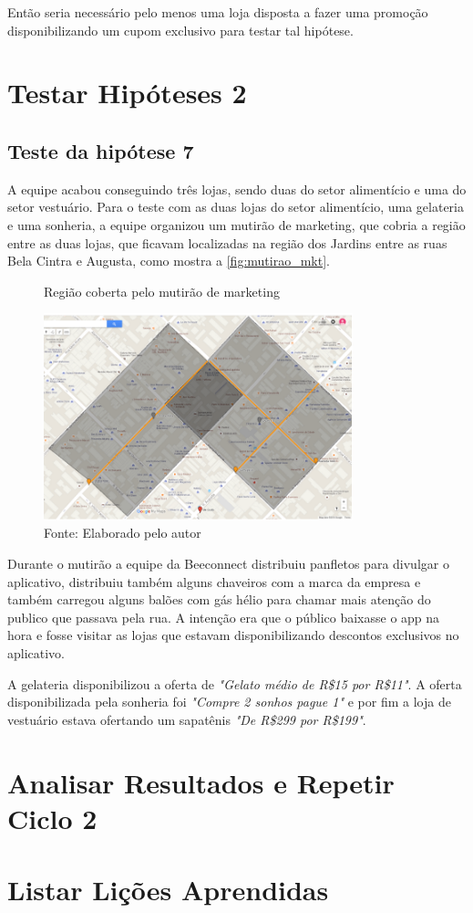 Então seria necessário pelo menos uma loja disposta a fazer uma promoção disponibilizando um cupom exclusivo para testar tal hipótese.
\section{Testar Hipóteses 2}
\label{cha:testar_hipoteses_2}

\subsection{Teste da hipótese 7}
\label{cha:teste_hipotese_7}
A equipe acabou conseguindo três lojas, sendo duas do setor alimentício e uma do setor vestuário. Para o teste com as duas lojas do setor alimentício, uma gelateria e uma sonheria, a equipe organizou um mutirão de marketing, que cobria a região entre as duas lojas, que ficavam localizadas na região dos Jardins entre as ruas Bela Cintra e Augusta, como mostra a \autoref{fig:mutirao_mkt}.
\begin{figure}[H]
\caption{Região coberta pelo mutirão de marketing}
\centerline{\includegraphics[width=0.8\textwidth]{img/mutirao_mkt}}
\label{fig:mutirao_mkt}
\caption* {Fonte: Elaborado pelo autor}
\end{figure}

Durante o mutirão a equipe da Beeconnect distribuiu panfletos para divulgar o aplicativo, distribuiu também alguns chaveiros com a marca da empresa e também carregou alguns balões com gás hélio para chamar mais atenção do publico que passava pela rua. A intenção era que o público baixasse o app na hora e fosse visitar as lojas que estavam disponibilizando descontos exclusivos no aplicativo.

A gelateria disponibilizou a oferta de \textit{"Gelato médio de R\$15 por R\$11"}. A oferta disponibilizada pela sonheria foi \textit{"Compre 2 sonhos pague 1"} e por fim a loja de vestuário estava ofertando um sapatênis \textit{"De R\$299 por R\$199"}.

\section{Analisar Resultados e Repetir Ciclo 2}
\label{cha:analisar_resultados_2}


\section{Listar Lições Aprendidas}
\label{cha:listar_licoes_aprendidas}